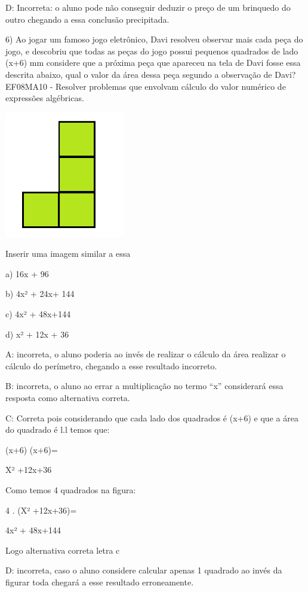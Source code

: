 D: Incorreta: o aluno pode não conseguir deduzir o preço de um brinquedo
do outro chegando a essa conclusão precipitada.

6) Ao jogar um famoso jogo eletrônico, Davi resolveu observar mais cada
peça do jogo, e descobriu que todas as peças do jogo possui pequenos
quadrados de lado (x+6) mm considere que a próxima peça que apareceu na
tela de Davi fosse essa descrita abaixo, qual o valor da área dessa peça
segundo a observação de Davi? EF08MA10 - Resolver problemas que envolvam
cálculo do valor numérico de expressões algébricas.

\includegraphics[width=2.05833in,height=2.16573in]{./imgSAEB_8_MAT/media/image57.png}

Inserir uma imagem similar a essa

a) 16x + 96

b) 4x² + 24x+ 144

c) 4x² + 48x+144

d) x² + 12x + 36

A: incorreta, o aluno poderia ao invés de realizar o cálculo da área
realizar o cálculo do perímetro, chegando a esse resultado incorreto.

B: incorreta, o aluno ao errar a multiplicação no termo ``x''
considerará essa resposta como alternativa correta.

C: Correta pois considerando que cada lado dos quadrados é (x+6) e que a
área do quadrado é l.l temos que:

(x+6) (x+6)=

X² +12x+36

Como temos 4 quadrados na figura:

4 . (X² +12x+36)=

4x² + 48x+144

Logo alternativa correta letra c

D: incorreta, caso o aluno considere calcular apenas 1 quadrado ao invés
da figurar toda chegará a esse resultado erroneamente.

